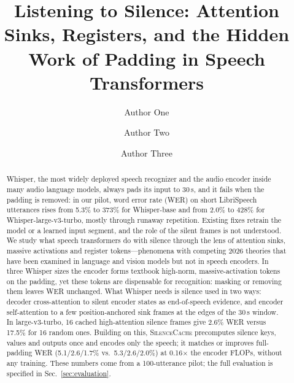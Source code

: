\documentclass[
  aps,
  pra,
  reprint,
  superscriptaddress,
  longbibliography,
  nofootinbib
]{revtex4-2}
\newcommand{\method}{\textsc{SilenceCache}}
\begin{document}
\title{Listening to Silence: Attention Sinks, Registers, and the Hidden Work of Padding in Speech Transformers}

\author{Author One}

\author{Author Two}

\author{Author Three}


\begin{abstract}
Whisper, the most widely deployed speech recognizer and the audio encoder inside many audio language models, always pads its input to 30\,s, and it fails when the padding is removed: in our pilot, word error rate (WER) on short LibriSpeech utterances rises from 5.3\% to 373\% for Whisper-base and from 2.0\% to 428\% for Whisper-large-v3-turbo, mostly through runaway repetition. Existing fixes retrain the model or a learned input segment, and the role of the silent frames is not understood. We study what speech transformers do with silence through the lens of attention sinks, massive activations and register tokens---phenomena with competing 2026 theories that have been examined in language and vision models but not in speech encoders. In three Whisper sizes the encoder forms textbook high-norm, massive-activation tokens on the padding, yet these tokens are dispensable for recognition: masking or removing them leaves WER unchanged. What Whisper needs is silence used in two ways: decoder cross-attention to silent encoder states as end-of-speech evidence, and encoder self-attention to a few position-anchored sink frames at the edges of the 30\,s window. In large-v3-turbo, 16 cached high-attention silence frames give 2.6\% WER versus 17.5\% for 16 random ones. Building on this, \method{} precomputes silence keys, values and outputs once and encodes only the speech; it matches or improves full-padding WER (5.1/2.6/1.7\% vs.\ 5.3/2.6/2.0\%) at 0.16$\times$ the encoder FLOPs, without any training. These numbers come from a 100-utterance pilot; the full evaluation is specified in Sec.~\ref{sec:evaluation}.
\end{abstract}

\maketitle
\end{document}
